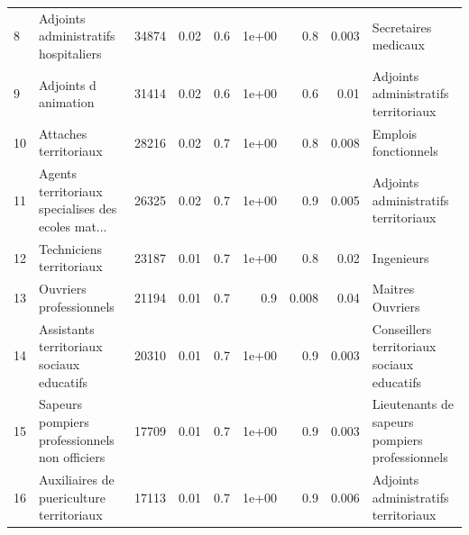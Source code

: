 \documentclass[11pt,a4paper]{article}
\begin{document}
\begin{tabular}{llrrrrrrl}
	8   &               Adjoints administratifs hospitaliers &          34874 &           0.02 &                    0.6 &              1e+00 &                               0.8 &                                    0.003 &                               Secretaires medicaux \\
	9   &                               Adjoints d animation &          31414 &           0.02 &                    0.6 &              1e+00 &                               0.6 &                                     0.01 &               Adjoints administratifs territoriaux \\
	10  &                              Attaches territoriaux &          28216 &           0.02 &                    0.7 &              1e+00 &                               0.8 &                                    0.008 &                               Emplois fonctionnels \\
	11  &  Agents territoriaux specialises des ecoles mat... &          26325 &           0.02 &                    0.7 &              1e+00 &                               0.9 &                                    0.005 &               Adjoints administratifs territoriaux \\
	12  &                           Techniciens territoriaux &          23187 &           0.01 &                    0.7 &              1e+00 &                               0.8 &                                     0.02 &                                         Ingenieurs \\
	13  &                            Ouvriers professionnels &          21194 &           0.01 &                    0.7 &                0.9 &                             0.008 &                                     0.04 &                                   Maitres Ouvriers \\
	14  &          Assistants territoriaux sociaux educatifs &          20310 &           0.01 &                    0.7 &              1e+00 &                               0.9 &                                    0.003 &         Conseillers territoriaux sociaux educatifs \\
	15  &      Sapeurs pompiers professionnels non officiers &          17709 &           0.01 &                    0.7 &              1e+00 &                               0.9 &                                    0.003 &     Lieutenants de sapeurs pompiers professionnels \\
	16  &           Auxiliaires de puericulture territoriaux &          17113 &           0.01 &                    0.7 &              1e+00 &                               0.9 &                                    0.006 &               Adjoints administratifs territoriaux \\

\end{tabular}
\end{document}

